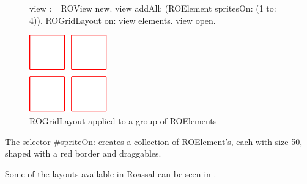 \documentclass[a4paper,10pt,twoside]{book}
\begin{document}
\begin{figure}[H]
      \begin{minipage}[t]{0.5\textwidth}
      \vspace{0pt}
     \begin{code}{}
view := ROView new.
view 
	addAll: (ROElement spritesOn: (1 to: 4)).
ROGridLayout on: view elements.
view open.
  \end{code}
   \end{minipage}
   \hfill
   \begin{minipage}[t]{0.6\textwidth}
      \vspace{0pt} \raggedright
       \centering
		\includegraphics[width=0.3\textwidth]{ROGrid} %
   \end{minipage}
\label{fig:ROGrid}
\caption{ROGridLayout applied to a group of ROElements}
\end{figure} 

The selector \#spriteOn: creates a collection of ROElement's, each with size 50, shaped with a red border and draggables.

Some of the layouts available in Roassal can be seen in .
\end{document}
